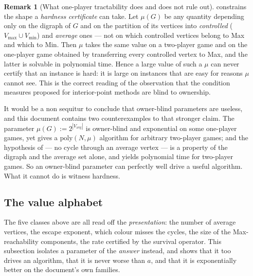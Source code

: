 \documentclass[11pt]{article}
\theoremstyle{plain}
\theoremstyle{definition}
\newtheorem{remark}[theorem]{Remark}
\newcommand{\Vmax}{V_{\max}}
\newcommand{\Vmin}{V_{\min}}
\newcommand{\Vavg}{V_{\mathrm{avg}}}
\begin{document}
\begin{remark}[What one-player tractability does and does not rule out]\label{rem:owner-blind}
 constrains the shape a \emph{hardness certificate}
can take. Let $\mu(G)$ be any quantity depending only on the digraph of
$G$ and on the partition of its vertices into \emph{controlled}
($\Vmax\cup\Vmin$) and \emph{average} ones --- not on which controlled
vertices belong to Max and which to Min. Then $\mu$ takes the same value
on a two-player game and on the one-player game obtained by transferring
every controlled vertex to Max, and the latter is solvable in polynomial
time. Hence a large value of such a $\mu$ can never certify that an
instance is hard: it is large on instances that are easy for reasons
$\mu$ cannot see. This is the correct reading of the observation that the
condition measures proposed for interior-point methods are blind to
ownership.

It would be a non sequitur to conclude that owner-blind parameters are
useless, and this document contains two counterexamples to that stronger
claim. The parameter $\mu(G):=2^{|\Vavg|}$ is owner-blind and exponential
on some one-player games, yet  gives a
$\mathrm{poly}(N,\mu)$ algorithm for arbitrary two-player games; and the
hypothesis of  --- no cycle through an average
vertex --- is a property of the digraph and the average set alone, and
yields polynomial time for two-player games. So an owner-blind parameter
can perfectly well drive a useful algorithm. What it cannot do is witness
hardness.
\end{remark}

\subsection{The value alphabet}\label{sec:alphabet}

The five classes above are all read off the \emph{presentation}: the
number of average vertices, the escape exponent, which colour misses the
cycles, the size of the Max-reachability components, the rate certified
by the survival operator. This subsection isolates a parameter of the
\emph{answer} instead, and shows that it too drives an algorithm, that it
is never worse than $a$, and that it is exponentially better on the
document's own families.
\end{document}
